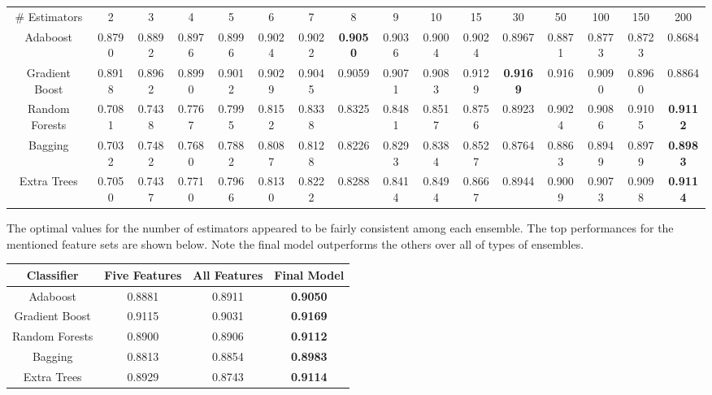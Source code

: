 \documentclass{article} %
\begin{document}
\begin{adjustbox}{width=\textwidth,totalheight=\textheight,keepaspectratio}
\begin{tabular}{c | c c c c c c c c c c c c c c c}
\# Estimators & 2 & 3 & 4 & 5 & 6 & 7 & 8 & 9 & 10 & 15 & 30 & 50 & 100 & 150 & 200\\
Adaboost & 0.8790 & 0.8892 & 0.8976 & 0.8996 & 0.9024 & 0.9022 & \textbf{0.9050} & 0.9036 & 0.9004 & 0.9024 & 0.8967 & 0.8871 & 0.8773 & 0.8723 & 0.8684\\
\hline
Gradient Boost & 0.8918 & 0.8962 & 0.8990 & 0.9012 & 0.9029 & 0.9045 & 0.9059 & 0.9071 & 0.9083 & 0.9129 & \textbf{0.9169} & 0.916 & 0.9090 & 0.8960 & 0.8864\\
Random Forests & 0.7081 & 0.7438 & 0.7767 & 0.7995 & 0.8152 & 0.8338 & 0.8325 & 0.8481 & 0.8517 & 0.8756 & 0.8923 & 0.9024 & 0.9086 & 0.9105 & \textbf{0.9112}\\
Bagging & 0.7032 & 0.7482 & 0.7680 & 0.7882 & 0.8087 & 0.8128 & 0.8226 & 0.8293 & 0.8384 & 0.8527 & 0.8764 & 0.8863 & 0.8949 & 0.8979 & \textbf{0.8983}\\
Extra Trees & 0.7050 & 0.7437 & 0.7710 & 0.7966 & 0.8130 & 0.8222 & 0.8288 & 0.8414 & 0.8494 & 0.8667 & 0.8944 & 0.9009 & 0.9073 & 0.9098 & \textbf{0.9114}
\end{tabular}
\end{adjustbox}

The optimal values for the number of estimators appeared to be fairly consistent
among each ensemble. The top performances for the mentioned feature sets are
shown below. Note the final model outperforms the others over all of types of
ensembles.

\begin{tabular}{c|ccc}
Classifier & Five Features & All Features & Final Model\\
\hline
Adaboost & 0.8881 & 0.8911 & \textbf{0.9050}\\
Gradient Boost & 0.9115 & 0.9031 & \textbf{0.9169}\\
Random Forests & 0.8900 & 0.8906 & \textbf{0.9112}\\
Bagging & 0.8813 & 0.8854 & \textbf{0.8983}\\
Extra Trees & 0.8929 & 0.8743 & \textbf{0.9114}
\end{tabular}

\clearpage
\end{document}
